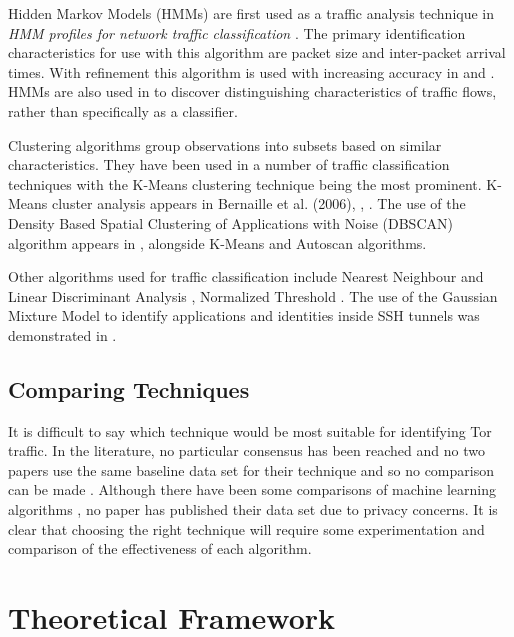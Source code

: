 \documentclass{conference}
\begin{document}
Hidden Markov Models (HMMs) are first used as a traffic analysis technique in \emph{HMM profiles for network traffic classification} \parencite{Wright:2004p3860}. The primary identification characteristics for use with this algorithm are packet size and inter-packet arrival times. With refinement this algorithm is used with increasing accuracy in \textcite{Wright:2006p322} and \textcite{Dainotti:2008p1435}. HMMs are also used in \textcite{Bernaille:2005p6205} to discover distinguishing characteristics of traffic flows, rather than specifically as a classifier.

Clustering algorithms group observations into subsets based on similar characteristics. They have been used in a number of traffic classification techniques with the K-Means clustering technique being the most prominent. K-Means cluster analysis appears in Bernaille et al. (2006), \textcite{Erman:2007p3764}, \textcite{Erman:2007p6206}. The use of the Density Based Spatial Clustering of Applications with Noise (DBSCAN) algorithm appears in \textcite{Erman:2006p3766}, alongside K-Means and Autoscan algorithms.

Other algorithms used for traffic classification include Nearest Neighbour and  Linear Discriminant Analysis \parencite{Roughan:2004p3823}, Normalized Threshold \parencite{Crotti:2007p3824}. The use of the Gaussian Mixture Model to identify applications and identities inside SSH tunnels was demonstrated in \textcite{Dusi:2008p6254}.

\subsection{Comparing Techniques}

It is difficult to say which technique would be most suitable for identifying Tor traffic. In the literature, no particular consensus has been reached and no two papers use the same baseline data set for their technique and so no comparison can be made \parencite{Kim:2007p3867}. Although there have been some comparisons of machine learning algorithms \parencite{Williams:2006p3849,Mohd:2009p6484}, no paper has published their data set due to privacy concerns. It is clear that choosing the right technique will require some experimentation and comparison of the effectiveness of each algorithm.

\section{Theoretical Framework}
\end{document}
